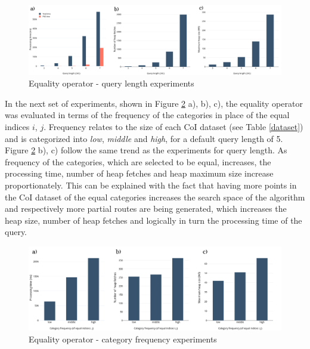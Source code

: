 \begin{figure}[H]
	\includegraphics[scale=0.25]{images/eo_length.png}
	\centering
	\caption{Equality operator - query length experiments}
	\label{fig:eo_length}
\end{figure}

In the next set of experiments, shown in Figure \ref{fig:eo_frequency} a), b), c), the equality operator was evaluated in terms of the frequency of the categories in place of the equal indices $i$, $j$. Frequency relates to the size of each CoI dataset (see Table \ref{dataset}) and is categorized into \textit{low}, \textit{middle} and \textit{high}, for a default query length of 5.  Figure \ref{fig:eo_frequency} b), c) follow the same trend as the experiments for query length. 
As frequency of the categories, which are selected to be equal, increases, the processing time, number of heap fetches and heap maximum size increase proportionately. This can be explained with the fact that having more points in the CoI dataset of the equal categories increases the search space of the algorithm and respectively more partial routes are being generated, which increases the heap size, number of heap fetches and logically in turn the processing time of the query.

\begin{figure}[H]
	\includegraphics[scale=0.3]{images/eo_frequency.png}
	\centering
	\caption{Equality operator - category frequency experiments}
	\label{fig:eo_frequency}
\end{figure}

